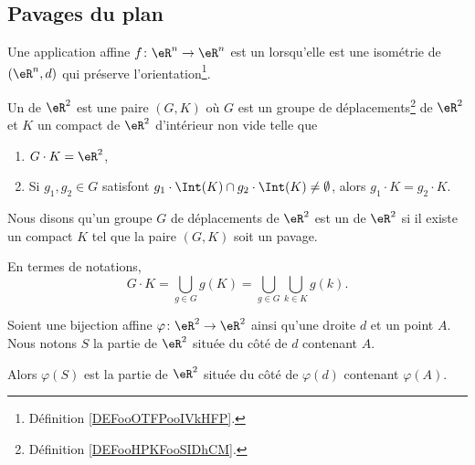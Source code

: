 
\subsection{Pavages du plan}

\begin{definition}      \label{DEFooHPKFooSIDhCM}
	Une application affine \( f\colon \eR^n\to \eR^n\) est un  lorsqu'elle est une isométrie de \( (\eR^n,d)\) qui préserve l'orientation\footnote{Définition \ref{DEFooOTFPooIVkHFP}.}.
\end{definition}

\begin{definition}      \label{DEFooJPHKooRgCBJs}
	Un  de \( \eR^2\) est une paire \( (G,K)\) où \( G\) est un groupe de déplacements\footnote{Définition \ref{DEFooHPKFooSIDhCM}.} de \( \eR^2\) et \( K\) un compact de \( \eR^2\) d'intérieur non vide telle que
	\begin{enumerate}
		\item
		      \( G\cdot K=\eR^2\),
		\item       \label{ITEMooOIJZooZMKLUm}
		      Si \( g_1,g_2\in G\) satisfont \( g_1\cdot \Int(K)\cap g_2\cdot\Int(K)\neq \emptyset\), alors \( g_1\cdot K=g_2\cdot K\).
	\end{enumerate}
	Nous disons qu'un groupe \( G\) de déplacements de \( \eR^2\) est un  de \( \eR^2\) si il existe un compact \( K\) tel que la paire \( (G,K)\) soit un pavage.
\end{definition}

En termes de notations,
\begin{equation}
	G\cdot K=\bigcup_{g\in G}g(K)=\bigcup_{g\in G}\bigcup_{k\in K}g(k).
\end{equation}

\begin{lemma}        \label{LEMooWZSWooZYkICn}
	Soient une bijection affine \( \varphi\colon \eR^2\to \eR^2\) ainsi qu'une droite \( d\) et un point \( A\). Nous notons \( S\) la partie de \( \eR^2\) située du côté de \( d\) contenant \( A\).

	Alors \( \varphi(S)\) est la partie de \( \eR^2\) située du côté de \( \varphi(d)\) contenant \( \varphi(A)\).
\end{lemma}

